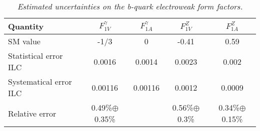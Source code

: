 \begin{table}
        \begin{center}
        \begin{tabular}{l c c c c}
        \hline
	Quantity  			& $F_{1V}^\gamma$ & $F_{1A}^\gamma$ &  $F_{1V}^Z$ &  $F_{1A}^Z$\\
	\hline
	SM value  			& -1/3   			& 0				  & -0.41		& 0.59\\
	Statistical error ILC   & 0.0016   			& 0.0014		  & 0.0023 		& 0.002\\
	Systematical error ILC   & 0.00116  			& 0.00116		  & 0.0012 		& 0.0009\\
	Relative error			& 0.49\%$\oplus$0.35\%			& 				  & 0.56\%$\oplus$0.3\%		& 0.34\%$\oplus$0.15\%\\
        \hline
        \end{tabular}
        \end{center}
        \caption{\sl Estimated uncertainties on the b-quark electroweak form factors.}
        \label{table:fffinal}
\end{table}
